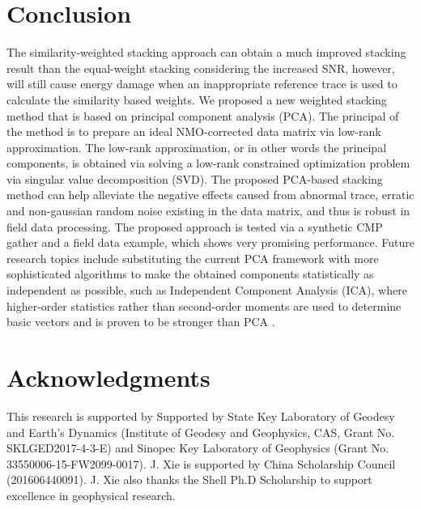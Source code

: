 \section{Conclusion}
The similarity-weighted stacking approach can obtain a much improved stacking result than the equal-weight stacking considering the increased SNR, however, will still cause
energy damage when an inappropriate reference trace is used to calculate the similarity based weights. %
We proposed a new weighted stacking method that is based on principal component analysis (PCA). The principal of the method is to prepare an ideal NMO-corrected data matrix via low-rank approximation. The low-rank approximation, or in other words the principal components, is obtained via solving a low-rank constrained optimization problem via singular value decomposition (SVD). The proposed PCA-based stacking method can help alleviate the negative effects caused from abnormal trace, erratic and non-gaussian random noise existing in the data matrix, and thus is robust in field data processing.  The proposed approach is tested via a synthetic CMP gather and a field data example, which shows very promising performance. Future research topics include substituting the current PCA framework with more sophisticated algorithms to make the obtained components statistically as independent as possible, such as Independent Component Analysis (ICA), where higher-order statistics rather than second-order moments are used to determine basic vectors and is proven to be stronger than PCA \cite[]{ica2001}.





\section{Acknowledgments}
This research is supported by Supported by State Key Laboratory of Geodesy and Earth's Dynamics (Institute of Geodesy and Geophysics, CAS, Grant No. SKLGED2017-4-3-E) and Sinopec Key Laboratory of Geophysics (Grant No. 33550006-15-FW2099-0017). J. Xie is supported by China Scholarship Council (201606440091). J. Xie also thanks the Shell Ph.D Scholarship to support excellence in geophysical research.







